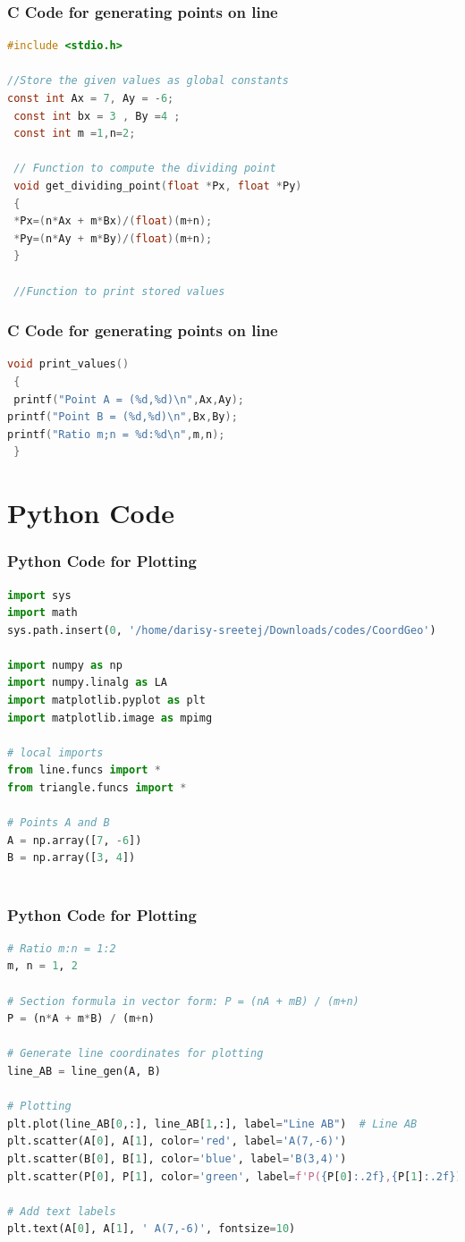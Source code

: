 \documentclass{beamer}
\theoremstyle{remark}
\numberwithin{equation}{section}
\begin{document}
\begin{frame}[fragile]
\frametitle{C Code for generating points on line}
\begin{lstlisting}[language=C]
   #include <stdio.h>

//Store the given values as global constants
const int Ax = 7, Ay = -6;
 const int bx = 3 , By =4 ;
 const int m =1,n=2;

 // Function to compute the dividing point 
 void get_dividing_point(float *Px, float *Py)
 {
 *Px=(n*Ax + m*Bx)/(float)(m+n);
 *Py=(n*Ay + m*By)/(float)(m+n);
 }

 //Function to print stored values 

\end{lstlisting}
\end{frame}

\begin{frame}[fragile]
\frametitle{C Code for generating points on line}
\begin{lstlisting}[language=C]
        void print_values()
 {
 printf("Point A = (%d,%d)\n",Ax,Ay);
printf("Point B = (%d,%d)\n",Bx,By);
printf("Ratio m;n = %d:%d\n",m,n);
 }
\end{lstlisting}
\end{frame}

\section{Python Code}
\begin{frame}[fragile]
\frametitle{Python Code for Plotting}
\begin{lstlisting}[language=Python]
import sys
import math
sys.path.insert(0, '/home/darisy-sreetej/Downloads/codes/CoordGeo')

import numpy as np
import numpy.linalg as LA
import matplotlib.pyplot as plt
import matplotlib.image as mpimg

# local imports
from line.funcs import *
from triangle.funcs import *

# Points A and B
A = np.array([7, -6])
B = np.array([3, 4])



\end{lstlisting}
\end{frame}

\begin{frame}[fragile]
\frametitle{Python Code for Plotting}
\begin{lstlisting}[language=Python]
# Ratio m:n = 1:2
m, n = 1, 2

# Section formula in vector form: P = (nA + mB) / (m+n)
P = (n*A + m*B) / (m+n)

# Generate line coordinates for plotting
line_AB = line_gen(A, B)

# Plotting
plt.plot(line_AB[0,:], line_AB[1,:], label="Line AB")  # Line AB
plt.scatter(A[0], A[1], color='red', label='A(7,-6)')
plt.scatter(B[0], B[1], color='blue', label='B(3,4)')
plt.scatter(P[0], P[1], color='green', label=f'P({P[0]:.2f},{P[1]:.2f})')

# Add text labels
plt.text(A[0], A[1], ' A(7,-6)', fontsize=10)

\end{lstlisting}
\end{frame}
\end{document}
